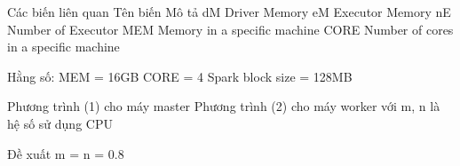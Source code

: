 Các biến liên quan
Tên biến
Mô tả
dM
Driver Memory 
eM
Executor Memory 
nE
Number of Executor 
MEM
Memory in a specific machine
CORE
Number of cores in a specific machine


Hằng số: 
MEM = 16GB
CORE = 4
Spark block size = 128MB

Phương trình (1) cho máy master
Phương trình (2) cho máy worker
với m, n là hệ số sử dụng CPU

Đề xuất m = n = 0.8

\label{appendix:nExecutors}